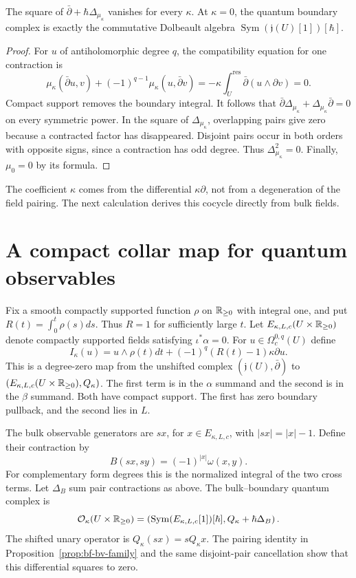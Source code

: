 \begin{lemma}
\label{lem:bf-boundary-differential}
The square of $\bar\partial+\hbar\Delta_{\mu_\kappa}$ vanishes
for every $\kappa$.  At $\kappa=0$, the quantum boundary complex is
exactly the commutative Dolbeault algebra
$\operatorname{Sym}(\mathfrak j(U)[1])[\hbar]$.
\end{lemma}
\begin{proof}
For $u$ of antiholomorphic degree $q$, the compatibility equation for
one contraction is
\[
 \mu_\kappa(\bar\partial u,v)
 +(-1)^{q-1}\mu_\kappa(u,\bar\partial v)
 =-\kappa\int_U^{\mathrm{res}}\bar\partial(u\wedge\partial v)=0.
\]
Compact support removes the boundary integral.  It follows that
$\bar\partial\Delta_{\mu_\kappa}+
\Delta_{\mu_\kappa}\bar\partial=0$ on every symmetric power.
In the square of $\Delta_{\mu_\kappa}$, overlapping pairs give zero
because a contracted factor has disappeared.  Disjoint pairs occur
in both orders with opposite signs, since a contraction has odd
degree.  Thus $\Delta_{\mu_\kappa}^2=0$.
Finally, $\mu_0=0$ by its formula.
\end{proof}

The coefficient $\kappa$ comes from the differential
$\kappa\partial$, not from a degeneration of the field pairing.
The next calculation derives this cocycle directly from bulk fields.

\section{A compact collar map for quantum observables}

Fix a smooth compactly supported function $\rho$ on $\mathbb R_{\ge0}$
with integral one, and put
$R(t)=\int_0^t\rho(s)ds$.  Thus $R=1$ for sufficiently large $t$.
Let $E_{\kappa,L,c}(U\times\mathbb R_{\ge0})$ denote compactly supported
fields satisfying $\iota^*\alpha=0$.
For $u\in\Omega_c^{0,q}(U)$ define
\[
 I_\kappa(u)=u\wedge\rho(t)dt
                +(-1)^q(R(t)-1)\kappa\partial u.
\]
This is a degree-zero map from the unshifted complex
$(\mathfrak j(U),\bar\partial)$ to
$(E_{\kappa,L,c}(U\times\mathbb R_{\ge0}),Q_\kappa)$.
The first term is in the $\alpha$ summand and the second is in the
$\beta$ summand.  Both have compact support.  The first has zero
boundary pullback, and the second lies in $L$.

The bulk observable generators are $sx$, for $x\in E_{\kappa,L,c}$,
with $|sx|=|x|-1$.  Define their contraction by
\[
 B(sx,sy)=(-1)^{|x|}\omega(x,y).
\]
For complementary form degrees this is the normalized integral
of the two cross terms.  Let $\Delta_B$ sum pair contractions as above.
The bulk--boundary quantum complex is
\[
 \mathcal O_\kappa(U\times\mathbb R_{\ge0})
 =\left(\operatorname{Sym}(E_{\kappa,L,c}[1])[\hbar],
                         Q_\kappa+\hbar\Delta_B\right).
\]
The shifted unary operator is $Q_\kappa(sx)=sQ_\kappa x$.
The pairing identity in Proposition~\ref{prop:bf-bv-family} and the
same disjoint-pair cancellation show that this differential squares
to zero.


